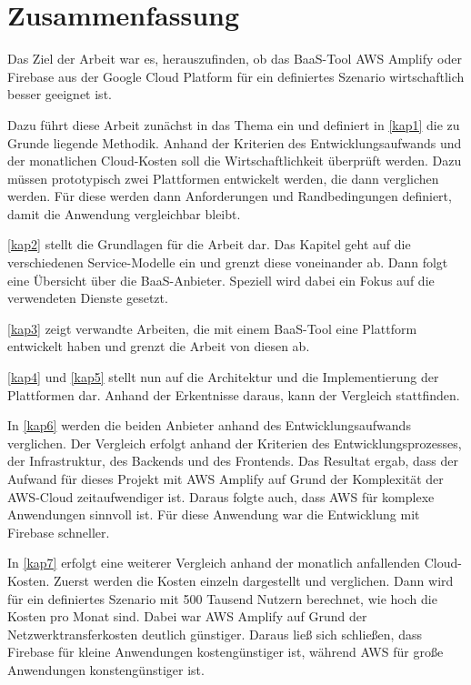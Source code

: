 \chapter{Zusammenfassung}

Das Ziel der Arbeit war es, herauszufinden, ob das \ac{BaaS}-Tool \ac{AWS} Amplify oder Firebase aus der Google Cloud Platform für ein definiertes Szenario wirtschaftlich besser geeignet ist.

Dazu führt diese Arbeit zunächst in das Thema ein und definiert in \autoref{kap1} die zu Grunde liegende Methodik. Anhand der Kriterien des Entwicklungsaufwands und der monatlichen Cloud-Kosten soll die Wirtschaftlichkeit überprüft werden. Dazu müssen prototypisch zwei Plattformen entwickelt werden, die dann verglichen werden. Für diese werden dann Anforderungen und Randbedingungen definiert, damit die Anwendung vergleichbar bleibt.

\autoref{kap2} stellt die Grundlagen für die Arbeit dar. Das Kapitel geht auf die verschiedenen Service-Modelle ein und grenzt diese voneinander ab. Dann folgt eine Übersicht über die \ac{BaaS}-Anbieter. Speziell wird dabei ein Fokus auf die verwendeten Dienste gesetzt.

\autoref{kap3} zeigt verwandte Arbeiten, die mit einem \ac{BaaS}-Tool eine Plattform entwickelt haben und grenzt die Arbeit von diesen ab.

\autoref{kap4} und \autoref{kap5} stellt nun auf die Architektur und die Implementierung der Plattformen dar. Anhand der Erkentnisse daraus, kann der Vergleich stattfinden.

In \autoref{kap6} werden die beiden Anbieter anhand des Entwicklungsaufwands verglichen. Der Vergleich erfolgt anhand der Kriterien des Entwicklungsprozesses, der Infrastruktur, des Backends und des Frontends. Das Resultat ergab, dass der Aufwand für dieses Projekt mit \ac{AWS} Amplify auf Grund der Komplexität der \ac{AWS}-Cloud zeitaufwendiger ist. Daraus folgte auch, dass \ac{AWS} für komplexe Anwendungen sinnvoll ist. Für diese Anwendung war die Entwicklung mit Firebase schneller.

In \autoref{kap7} erfolgt eine weiterer Vergleich anhand der monatlich anfallenden Cloud-Kosten. Zuerst werden die Kosten einzeln dargestellt und verglichen. Dann wird für ein definiertes Szenario mit 500 Tausend Nutzern berechnet, wie hoch die Kosten pro Monat sind. Dabei war \ac{AWS} Amplify auf Grund der Netzwerktransferkosten deutlich günstiger. Daraus ließ sich schließen, dass Firebase für kleine Anwendungen kostengünstiger ist, während \ac{AWS} für große Anwendungen konstengünstiger ist.

